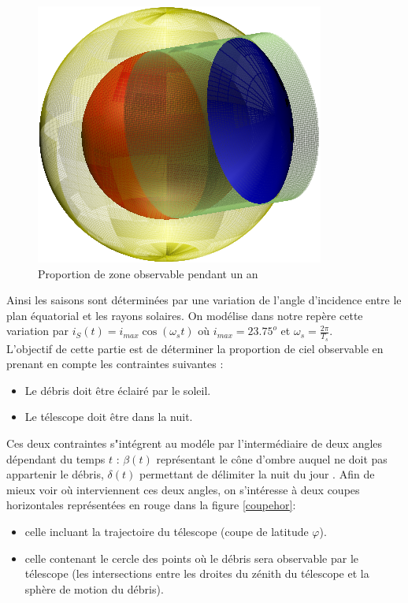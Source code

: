 \documentclass[a4paper,11pt]{article}
\numberwithin{section}{part}
\begin{document}
 \begin{figure}[h]\label{ombre}
    \centering
    \includegraphics[width=.6\textwidth]{figures/ombre.pdf}
    \caption{Proportion de zone observable pendant un an}
 \end{figure}
 
\vspace{0.5cm} Ainsi les saisons sont déterminées par une variation de l'angle d'incidence entre le plan équatorial et les rayons solaires.
On modélise dans notre repère cette variation par $i_{S}(t)= i_{max}\cos(\omega_{s}t)$ où $i_{max}=23.75^o$ et $\displaystyle{\omega_s=\frac{2\pi}{T_s}}$. \\
 
L'objectif de cette partie est de d\'eterminer la proportion de ciel observable en prenant en compte les contraintes suivantes : 

\begin{itemize}
\item Le d\'ebris doit \^etre \'eclair\'e par le soleil. 
\item Le t\'elescope doit \^etre dans la nuit.
\end{itemize}

\vspace{0.5cm}

Ces deux contraintes s"int\'egrent au mod\'ele par l'interm\'ediaire de deux angles d\'ependant du temps $t$ : $\beta(t)$ repr\'esentant le c\^one d'ombre auquel ne doit pas appartenir le d\'ebris, $\delta(t)$ permettant de d\'elimiter la nuit du jour . Afin de mieux voir o\`u interviennent ces deux angles, on s'int\'eresse \`a deux coupes horizontales repr\'esent\'ees en rouge dans la figure \ref{coupehor}:
\begin{itemize}
\item celle incluant la trajectoire du t\'elescope (coupe de latitude $\varphi$).
\item celle contenant le cercle des points o\`u le d\'ebris sera observable par le t\'elescope (les intersections entre les droites du z\'enith du t\'elescope et la sph\`ere de motion du d\'ebris).
\end{itemize}
\end{document}

